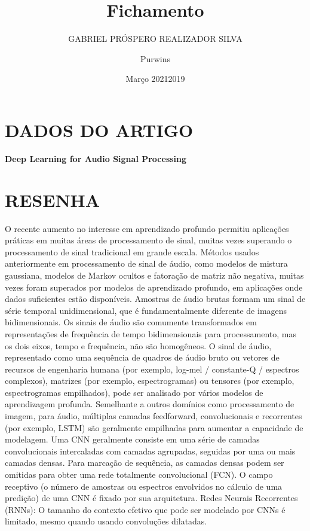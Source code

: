 \documentclass{article}
\title{Fichamento}
\author{GABRIEL PRÓSPERO REALIZADOR  SILVA}
\date{Março 2021}
\begin{document}
\maketitle

\section{DADOS DO ARTIGO}
\textbf{Deep Learning for Audio Signal Processing \\}
\author{Purwins\\}
\date{2019}

\section{RESENHA}
O recente aumento no interesse em aprendizado profundo permitiu aplicações práticas em muitas áreas de processamento de sinal, muitas vezes superando o processamento de sinal tradicional em grande escala.
Métodos usados ​​anteriormente em processamento de sinal de áudio, como modelos de mistura gaussiana, modelos de Markov ocultos e fatoração de matriz não negativa, muitas vezes foram superados por modelos de aprendizado profundo, em aplicações onde dados suficientes estão disponíveis.
Amostras de áudio brutas formam um sinal de série temporal unidimensional, que é fundamentalmente diferente de imagens bidimensionais. Os sinais de áudio são comumente transformados em representações de frequência de tempo bidimensionais para processamento, mas os dois eixos, tempo e frequência, não são homogêneos.
O sinal de áudio, representado como uma sequência de quadros de áudio bruto ou vetores de recursos de engenharia humana (por exemplo, log-mel / constante-Q / espectros complexos), matrizes (por exemplo, espectrogramas) ou tensores (por exemplo, espectrogramas empilhados), pode ser analisado por vários modelos de aprendizagem profunda. Semelhante a outros domínios como processamento de imagem, para áudio, múltiplas camadas feedforward, convolucionais e recorrentes (por exemplo, LSTM) são geralmente empilhadas para aumentar a capacidade de modelagem.
Uma CNN geralmente consiste em uma série de camadas convolucionais intercaladas com camadas agrupadas, seguidas por uma ou mais camadas densas. Para marcação de sequência, as camadas densas podem ser omitidas para obter uma rede totalmente convolucional (FCN). O campo receptivo (o número de amostras ou espectros envolvidos no cálculo de uma predição) de uma CNN é fixado por sua arquitetura.
Redes Neurais Recorrentes (RNNs): O tamanho do contexto efetivo que pode ser modelado por CNNs é limitado, mesmo quando usando convoluções dilatadas.
\end{document}

